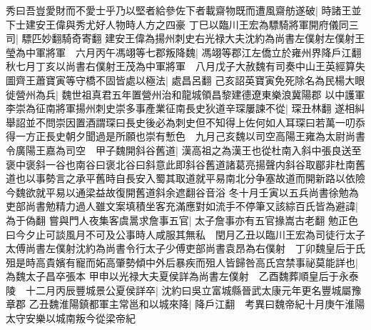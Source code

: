 秀曰吾豈愛財而不愛士乎乃以堅者給參佐下者載齋物既而遭風齋舫遂破|{
	時諸王並下士建安王偉與秀尤好人物時人方之四豪}
丁巳以臨川王宏為驃騎將軍開府儀同三司|{
	驃匹妙翻騎奇寄翻}
建安王偉為揚州刺史右光禄大夫沈約為尚書左僕射左僕射王瑩為中軍將軍　六月丙午馮翊等七郡叛降魏|{
	馮翊等郡江左僑立於雍州界降戶江翻}
秋七月丁亥以尚書右僕射王茂為中軍將軍　八月戊子大赦魏有司奏中山王英經算失圖齊王蕭寶寅等守橋不固皆處以極法|{
	處昌呂翻}
己亥詔英寶寅免死除名為民楊大眼徙營州為兵|{
	魏世祖真君五年置營州治和龍城領昌黎建德遼東樂浪冀陽郡}
以中護軍李崇為征南將軍揚州刺史崇多事產業征南長史狄道辛琛屢諫不從|{
	琛丑林翻}
遂相糾舉詔並不問崇因置酒謂琛曰長史後必為刺史但不知得上佐何如人耳琛曰若萬一叨忝得一方正長史朝夕聞過是所願也崇有慙色　九月己亥魏以司空高陽王雍為太尉尚書令廣陽王嘉為司空　甲子魏開斜谷舊道|{
	漢高祖之為漢王也從杜南入斜中張良送至褒中褒斜一谷也南谷曰褒北谷曰斜意此即斜谷舊道諸葛亮揚聲内斜谷取郿非杜南舊道也以事勢言之承平舊時自長安入蜀其取道就平易南北分争塞故道而開新路以依險今魏欲就平易以通梁益故復開舊道斜余遮翻谷音浴}
冬十月壬寅以五兵尚書徐勉為吏部尚書勉精力過人雖文案填積坐客充滿應對如流手不停筆又該綜百氏皆為避諱|{
	為于偽翻}
嘗與門人夜集客虞暠求詹事五官|{
	太子詹事亦有五官掾嵩古老翻}
勉正色曰今夕止可談風月不可及公事時人咸服其無私　閏月乙丑以臨川王宏為司徒行太子太傅尚書左僕射沈約為尚書令行太子少傅吏部尚書袁昂為右僕射　丁卯魏皇后于氏殂是時高貴嬪有寵而妬高肇勢傾中外后暴疾而殂人皆歸咎高氏宫禁事祕莫能詳也|{
	為魏太子昌卒張本}
甲申以光禄大夫夏侯詳為尚書左僕射　乙酉魏葬順皇后于永泰陵　十二月丙辰豐城景公夏侯詳卒|{
	沈約曰吳立富城縣晉武太康元年更名豐城屬豫章郡}
乙丑魏淮陽鎮都軍主常邕和以城來降|{
	降戶江翻　考異曰魏帝紀十月庚午淮陽太守安樂以城南叛今從梁帝紀}


